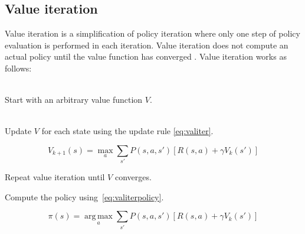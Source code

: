 \subsection{Value iteration}
\label{sec:valueiteration}

Value iteration is a simplification of policy iteration where only one step of
policy evaluation is performed in each iteration. Value iteration does not compute an actual
policy until the value function has converged \parencite{barto1998reinforcement}. Value iteration works as follows:

\begin{description}
\item[Initialization] \hfill \\
    Start with an arbitrary value function $V$.
\item[Value iteration] \hfill \\
    Update $V$ for each state using the update rule \eqref{eq:valiter}.

\begin{equation} \label{eq:valiter}
V_{k+1}(s) = \max_a \sum_{s'}{P(s, a, s') \left[R(s, a) + \gamma V_k(s')\right]}
\end{equation}

\item Repeat value iteration until $V$ converges.
\item Compute the policy using~\eqref{eq:valiterpolicy}.

\begin{equation} \label{eq:valiterpolicy}
\pi(s) = \operatorname*{arg\,max}_a \sum_{s'}{P(s, a, s') \left[R(s, a) + \gamma V_k(s')\right]}
\end{equation}

\end{description}
